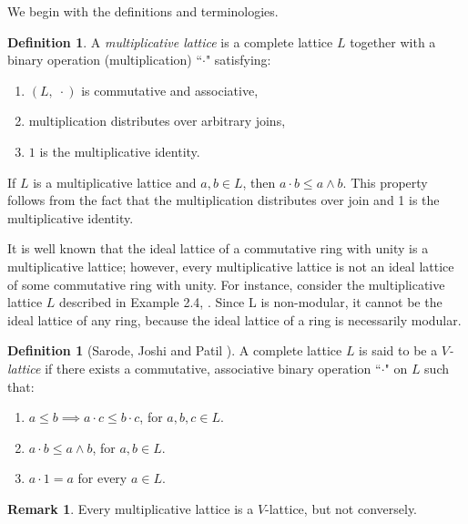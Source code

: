 \documentclass[10pt,twoside,a4]{amsart}
\numberwithin{equation}{section}
\theoremstyle{plain}
\theoremstyle{definition}
\newtheorem{rem}[lem]{Remark}
\newtheorem{defn}[lem]{Definition}
\begin{document}
	We begin with the definitions and terminologies.
	
		\begin{defn}
		A \textit{multiplicative lattice} is a complete lattice $L$ together with a binary operation (multiplication) ``$\cdot$" satisfying:
		\begin{enumerate}
			\item $(L,\;\cdot)$ is commutative and associative,
			\item multiplication distributes over arbitrary joins,
			\item $1$ is the multiplicative identity.
		\end{enumerate}
	\end{defn}
	

	

	
	
	


	If $L$ is a multiplicative lattice and $a, b \in L$, then $a\cdot b \leq a \wedge b$. This property follows from the fact that the multiplication distributes over join and 1 is the multiplicative identity. 
	
It is well known that the ideal lattice of a commutative ring with unity is a multiplicative lattice; however, every multiplicative lattice is not an ideal lattice of some commutative ring with unity. For instance, consider the multiplicative lattice $L$ described in Example 2.4, \cite{JS}. Since L is non-modular, it cannot be the ideal lattice of any ring, because the ideal lattice of a ring is necessarily modular.
	

	\begin{defn}[Sarode, Joshi and Patil \cite{SJP}]\label{def:vlattice}
		A complete lattice $L$ is said to be a \textit{$V$-lattice} if there exists a commutative, associative binary operation ``$\cdot$" on $L$ such that:
		\begin{enumerate}
		\item $a \leq b \implies a \cdot c \leq b \cdot c$, for  $a, b, c\in L$.
			\item $a \cdot b \leq a \wedge b$, for  $a, b\in L$.
			\item $a \cdot 1 = a$ for every $a\in L$.
		\end{enumerate}
	\end{defn}
	
	\begin{rem} \label{1.7.}
		Every multiplicative lattice is a $V$-lattice, but not conversely.
	\end{rem}
\end{document}
